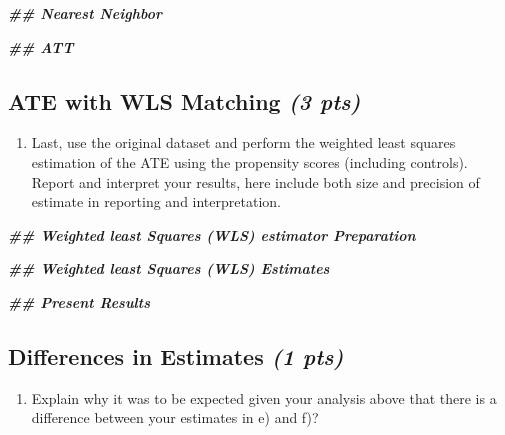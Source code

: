 \documentclass[
]{article}
\newenvironment{Shaded}{\begin{snugshade}}{\end{snugshade}}
\newcommand{\DocumentationTok}[1]{\textcolor[rgb]{0.56,0.35,0.01}{\textbf{\textit{#1}}}}
\providecommand{\tightlist}{%
  \setlength{\itemsep}{0pt}\setlength{\parskip}{0pt}}
\begin{document}
\begin{Shaded}
\begin{Highlighting}[]
\DocumentationTok{\#\# Nearest Neighbor }

\DocumentationTok{\#\# ATT}
\end{Highlighting}
\end{Shaded}

\hypertarget{ate-with-wls-matching-3-pts}{%
\subsection{\texorpdfstring{ATE with WLS Matching \emph{(3
pts)}}{ATE with WLS Matching (3 pts)}}\label{ate-with-wls-matching-3-pts}}

\begin{enumerate}
\def\labelenumi{\alph{enumi})}
\setcounter{enumi}{5}
\tightlist
\item
  Last, use the original dataset and perform the weighted least squares
  estimation of the ATE using the propensity scores (including
  controls). Report and interpret your results, here include both size
  and precision of estimate in reporting and interpretation.
\end{enumerate}

\begin{Shaded}
\begin{Highlighting}[]
\DocumentationTok{\#\# Weighted least Squares (WLS) estimator Preparation}


\DocumentationTok{\#\# Weighted least Squares (WLS) Estimates}


\DocumentationTok{\#\# Present Results}
\end{Highlighting}
\end{Shaded}

\hypertarget{differences-in-estimates-1-pts}{%
\subsection{\texorpdfstring{Differences in Estimates \emph{(1
pts)}}{Differences in Estimates (1 pts)}}\label{differences-in-estimates-1-pts}}

\begin{enumerate}
\def\labelenumi{\alph{enumi})}
\setcounter{enumi}{6}
\tightlist
\item
  Explain why it was to be expected given your analysis above that there
  is a difference between your estimates in e) and f)?
\end{enumerate}
\end{document}

